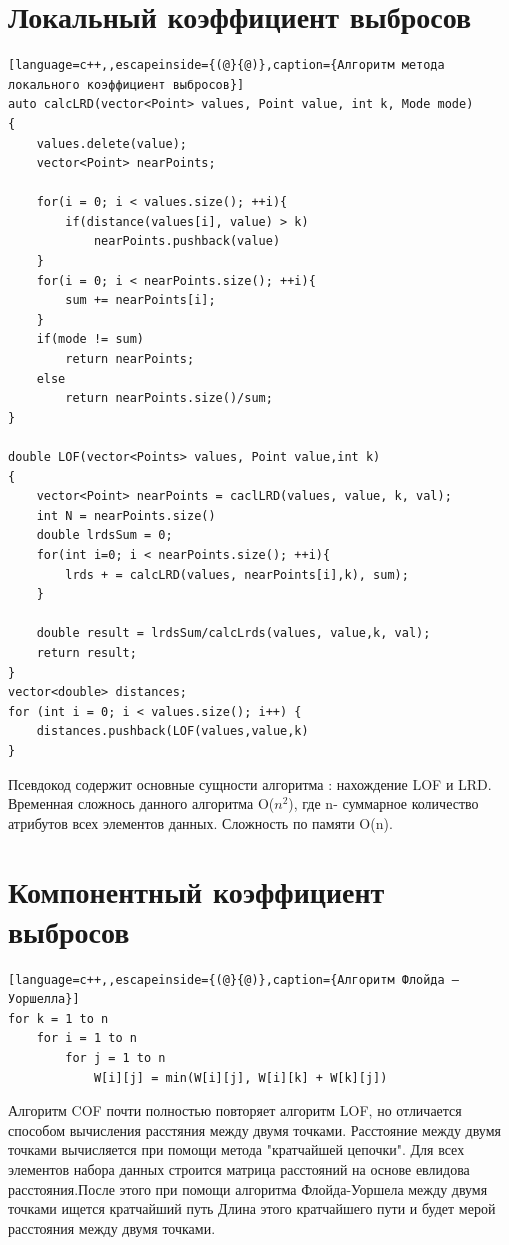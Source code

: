\section{Локальный коэффициент выбросов}

\begin{lstlisting}[language=c++,,escapeinside={(@}{@)},caption={Алгоритм метода локального коэффициент выбросов}] 
auto calcLRD(vector<Point> values, Point value, int k, Mode mode)
{
	values.delete(value);
	vector<Point> nearPoints;
	
	for(i = 0; i < values.size(); ++i){
		if(distance(values[i], value) > k)
			nearPoints.pushback(value)
	}
	for(i = 0; i < nearPoints.size(); ++i){
		sum += nearPoints[i];
	}
	if(mode != sum)
		return nearPoints;
	else 
		return nearPoints.size()/sum;
}

double LOF(vector<Points> values, Point value,int k)
{
    vector<Point> nearPoints = caclLRD(values, value, k, val);
    int N = nearPoints.size()
    double lrdsSum = 0;
	for(int i=0; i < nearPoints.size(); ++i){
		lrds + = calcLRD(values, nearPoints[i],k), sum);
	}
	
	double result = lrdsSum/calcLrds(values, value,k, val);
	return result;		
}
vector<double> distances;
for (int i = 0; i < values.size(); i++) {
	distances.pushback(LOF(values,value,k)
}
\end{lstlisting}
Псевдокод содержит основные сущности алгоритма : нахождение LOF и LRD. Временная сложнось данного алгоритма O($n^2$), где n- суммарное количество атрибутов всех элементов данных. Сложность по памяти O(n).
\section{Компонентный коэффициент выбросов}
\begin{lstlisting}[language=c++,,escapeinside={(@}{@)},caption={Алгоритм Флойда — Уоршелла}] 
for k = 1 to n
	for i = 1 to n
		for j = 1 to n
			W[i][j] = min(W[i][j], W[i][k] + W[k][j])
\end{lstlisting}
Алгоритм COF почти полностью повторяет алгоритм LOF, но отличается способом вычисления расстяния между двумя точками. Расстояние между двумя точками вычисляется при помощи метода "кратчайшей цепочки". Для всех  элементов набора данных строится матрица расстояний на основе евлидова расстояния.После этого при помощи алгоритма Флойда-Уоршела между двумя точками ищется кратчайший путь Длина этого кратчайшего пути и будет мерой расстояния между двумя точками. 



